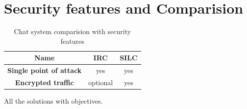 \section{Security features and Comparision}

\begin{longtable}{|c|c|c|}
\caption{Chat system comparision with security features}\\
\hline
\textbf{Name} & \textbf{IRC} & \textbf{SILC}\\
\hline
\textbf{Single point of attack} & yes & yes\\
\hline
\textbf{Encrypted traffic} & optional & yes\\
\hline
\end{longtable}

All the solutions with objectives.
